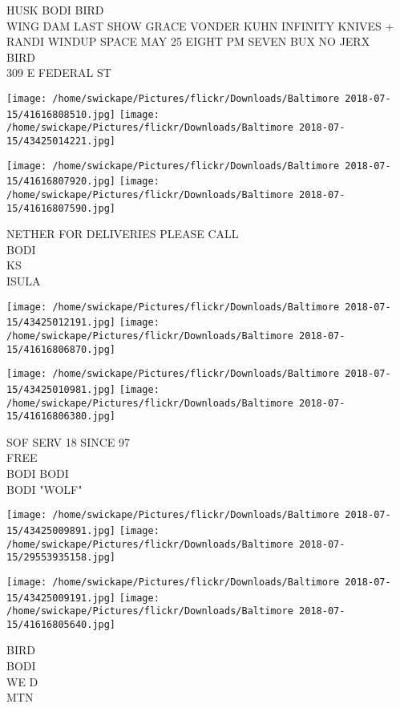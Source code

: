 \documentclass[10pt,letterpaper]{article}
\begin{document}
HUSK BODI BIRD\\
WING DAM LAST SHOW GRACE VONDER KUHN INFINITY KNIVES + RANDI WINDUP SPACE MAY 25 EIGHT PM SEVEN BUX NO JERX\\
BIRD\\
309 E FEDERAL ST\\
\pagebreak

\texttt{[image: /home/swickape/Pictures/flickr/Downloads/Baltimore 2018-07-15/41616808510.jpg]}
\texttt{[image: /home/swickape/Pictures/flickr/Downloads/Baltimore 2018-07-15/43425014221.jpg]}

\texttt{[image: /home/swickape/Pictures/flickr/Downloads/Baltimore 2018-07-15/41616807920.jpg]}
\texttt{[image: /home/swickape/Pictures/flickr/Downloads/Baltimore 2018-07-15/41616807590.jpg]}

NETHER FOR DELIVERIES PLEASE CALL\\
BODI\\
KS\\
ISULA\\
\pagebreak

\texttt{[image: /home/swickape/Pictures/flickr/Downloads/Baltimore 2018-07-15/43425012191.jpg]}
\texttt{[image: /home/swickape/Pictures/flickr/Downloads/Baltimore 2018-07-15/41616806870.jpg]}

\texttt{[image: /home/swickape/Pictures/flickr/Downloads/Baltimore 2018-07-15/43425010981.jpg]}
\texttt{[image: /home/swickape/Pictures/flickr/Downloads/Baltimore 2018-07-15/41616806380.jpg]}

SOF SERV 18 SINCE 97\\
FREE\\
BODI BODI\\
BODI "WOLF"\\
\pagebreak

\texttt{[image: /home/swickape/Pictures/flickr/Downloads/Baltimore 2018-07-15/43425009891.jpg]}
\texttt{[image: /home/swickape/Pictures/flickr/Downloads/Baltimore 2018-07-15/29553935158.jpg]}

\texttt{[image: /home/swickape/Pictures/flickr/Downloads/Baltimore 2018-07-15/43425009191.jpg]}
\texttt{[image: /home/swickape/Pictures/flickr/Downloads/Baltimore 2018-07-15/41616805640.jpg]}

BIRD\\
BODI\\
WE D\\
MTN\\
\pagebreak
\end{document}
